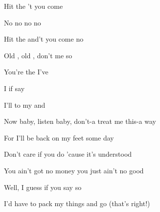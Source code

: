 
\zr
Hit the   't you come 

No  no  no  no 

Hit the   and't you come  no    

\kr
\zs

Old , old , don't  me so 

You're the   I've  

I  if  say  

I'll  to  my  and 

\ks
\zr
\kr
\zs

Now baby, listen baby, don't-a treat me this-a way

For I'll be back on my feet some day

Don't care if you do 'cause it's understood

You ain't got no money you just ain't no good


Well, I guess if you say so

I'd have to pack my things and go (that's right!)

\ks

\zr
\kr

\zr
\kr

\kp


